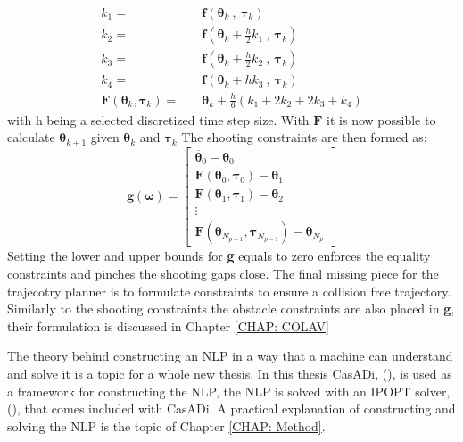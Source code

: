 \begin{equation}
    \label{EQ: RK4}
    \begin{split}
    k_1 = \quad & \textbf{f}(\bm{\theta}_{k} \ , \ \bm{\tau}_k) \\
    k_2 = \quad & \textbf{f}(\bm{\theta}_{k} + \frac{h}{2}k_1 \ , \ \bm{\tau}_k) \\
    k_3 = \quad & \textbf{f}(\bm{\theta}_{k} + \frac{h}{2}k_2 \ , \ \bm{\tau}_k) \\ 
    k_4 = \quad & \textbf{f}(\bm{\theta}_{k} + h k_3 \ , \ \bm{\tau}_k) \\ 
    \textbf{F}(\bm{\theta}_{k}, \bm{\tau}_k) = \quad & \bm{\theta}_k + \frac{h}{6} (k_1 + 2k_2 + 2k_3 + k_4)
    \end{split}
\end{equation}
with h being a selected discretized time step size. With $\textbf{F}$ it is now possible to calculate $\bm{\theta}_{k+1}$ given $\bm{\theta}_k$ and $\bm{\tau}_k$
The shooting constraints are then formed as:
\begin{equation}
    \textbf{g}(\bm{\omega}) = \begin{bmatrix}
                            \overline{\bm{\theta}}_0 - \bm{\theta}_0 \\
                            \textbf{F}(\bm{\theta}_{0}, \bm{\tau}_0) - \bm{\theta}_1 \\
                            \textbf{F}(\bm{\theta}_{1}, \bm{\tau}_1) - \bm{\theta}_2 \\
                            \vdots \\
                            \textbf{F}(\bm{\theta}_{N_{p-1}}, \bm{\tau}_{N_{p-1}}) - \bm{\theta}_{N_{p}}
                             \end{bmatrix}
\end{equation}
Setting the lower and upper bounds for \textbf{g} equals to zero enforces the equality constraints and pinches the shooting gaps close. The final missing piece for the trajecotry planner
is to formulate constraints to ensure a collision free trajectory. Similarly to the shooting constraints the obstacle constraints are also placed in \textbf{g}, their
formulation is discussed in Chapter \ref{CHAP: COLAV}

The theory behind constructing an \gls{NLP} in a way that a machine can understand and solve it is a topic for a whole new thesis. In this thesis CasADi, (\cite{andersson2019casadi}), is used
as a framework for constructing the NLP, the NLP is solved with an \gls{IPOPT} solver, (\cite{wachter2006implementation}), that comes included with CasADi. A practical
explanation of constructing and solving the NLP is the topic of Chapter \ref{CHAP: Method}.

